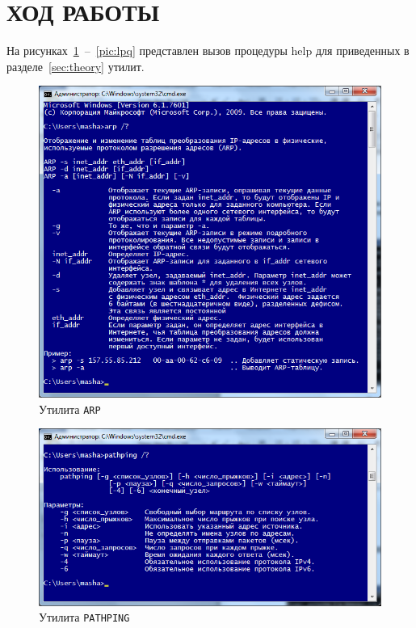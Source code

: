 \pagebreak

\section{ХОД РАБОТЫ}

На рисунках~\ref{pic:arp}~--~\ref{pic:lpq} представлен вызов процедуры help для
приведенных в разделе~\ref{sec:theory} утилит.

\begin{figure}[h!]
  \centering
  \includegraphics[width=0.6\linewidth]{pic/arp}
  \caption{Утилита \texttt{ARP}}
  \label{pic:arp}
\end{figure}

\begin{figure}[h!]
  \centering
  \includegraphics[width=0.9\linewidth]{pic/pathping}
  \caption{Утилита \texttt{PATHPING}}
  \label{pic:pathping}
\end{figure}

\newpage

